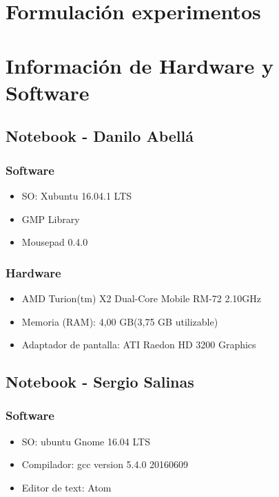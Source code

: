 \documentclass[12pt,letterpaper]{scrartcl}
\begin{document}
\newpage
\section{Formulación experimentos}

\section{Información de Hardware y Software}


\subsection{ Notebook - Danilo Abellá}
\subsubsection{Software}
\begin{itemize}
\item SO: Xubuntu 16.04.1 LTS
\item GMP Library
\item Mousepad 0.4.0
\end{itemize}

\subsubsection{Hardware}
\begin{itemize}
\item AMD Turion(tm) X2 Dual-Core Mobile RM-72 2.10GHz
\item Memoria (RAM): 4,00 GB(3,75 GB utilizable)
\item Adaptador de pantalla: ATI Raedon HD 3200 Graphics
\end{itemize}



\subsection{Notebook - Sergio Salinas}
\subsubsection{Software}
\begin{itemize}
\item  SO: ubuntu Gnome 16.04 LTS
\item Compilador: gcc version 5.4.0 20160609 
\item Editor de text: Atom
\end{itemize}
\end{document}
